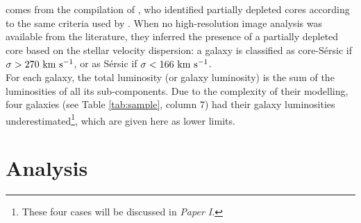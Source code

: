 \documentclass[preprint2]{emulateapj}
\begin{document}
comes from the compilation of \citet{savorgnangraham2014},
who identified partially depleted cores according to the same criteria used by \citet{grahamscott2013}.
When no high-resolution image analysis was available from the literature, 
they inferred the presence of a partially depleted core based on the stellar velocity dispersion:
a galaxy is classified as core-S\'ersic if $\sigma > 270\rm~km~s^{-1}$,
or as S\'ersic if $\sigma < 166\rm~km~s^{-1}$. \\
For each galaxy, the total luminosity (or galaxy luminosity) is the sum of the luminosities of all its sub-components. 
Due to the complexity of their modelling, 
four galaxies (see Table \ref{tab:sample}, column 7) had their galaxy luminosities 
underestimated\footnote{These four cases will be discussed in \emph{Paper I}.}, 
which are given here as lower limits. 




 







\section{Analysis}
\label{sec:anal}
\end{document}
